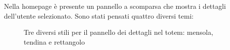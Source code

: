 Nella homepage è presente un pannello a scomparsa che mostra i dettagli dell'utente selezionato. Sono stati pensati quattro diversi temi:
\begin{figure}[h]
    \centering
    \caption{Tre diversi stili per il pannello dei dettagli nel totem: mensola, tendina e rettangolo}
    \label{fig:detailBanner}
\end{figure}

